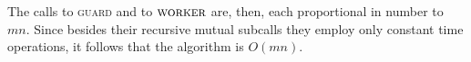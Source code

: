 \documentclass[
]{article}
\begin{document}
The calls to \textsc{guard} and to $\textsc{worker}$ are, then, each proportional in number to $mn$.  Since besides their recursive mutual subcalls they employ only constant time operations, it follows that the algorithm is $O(mn)$.
















\end{document}
